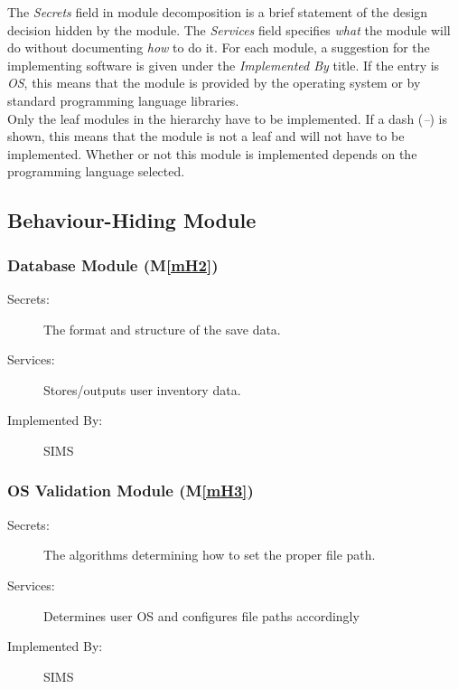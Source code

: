 \documentclass[12pt, titlepage]{article}
\newcommand{\mref}[1]{M\ref{#1}}
\begin{document}
The \emph{Secrets} field in module decomposition is a brief statement of the design decision hidden by the module. The \emph{Services} field specifies \emph{what} the module will do
without documenting \emph{how} to do it. For each module, a suggestion for the
implementing software is given under the \emph{Implemented By} title. If the
entry is \emph{OS}, this means that the module is provided by the operating
system or by standard programming language libraries.  \\

\noindent Only the leaf modules in the
hierarchy have to be implemented. If a dash (\emph{--}) is shown, this means
that the module is not a leaf and will not have to be implemented. Whether or
not this module is implemented depends on the programming language
selected.

\subsection{Behaviour-Hiding Module}

\subsubsection{Database Module (\mref{mH2})}
\begin{description}
\item[Secrets:]The format and structure of the save data.
\item[Services:] Stores/outputs user inventory data.
\item[Implemented By:] SIMS
\end{description}

\subsubsection{OS Validation Module (\mref{mH3})}
\begin{description}
\item[Secrets:]The algorithms determining how to set the proper file path.
\item[Services:]Determines user OS and configures file paths accordingly
\item[Implemented By:] SIMS
\end{description}
\end{document}
